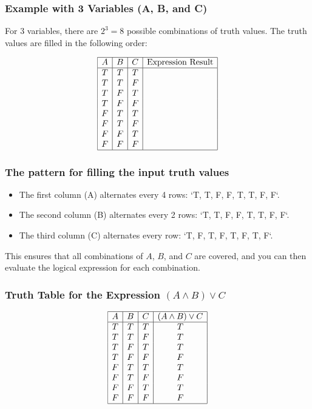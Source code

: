 \subsubsection{Example with 3 Variables (A, B, and C)}

For 3 variables, there are \(2^3 = 8\) possible combinations of truth values. The truth values are filled in the following order:

\[
\begin{array}{|c|c|c|c|}
\hline
A & B & C & \text{Expression Result} \\
\hline
T & T & T & \\
T & T & F & \\
T & F & T & \\
T & F & F & \\
F & T & T & \\
F & T & F & \\
F & F & T & \\
F & F & F & \\
\hline
\end{array}
\]

\subsubsection{The pattern for filling the input truth values}
\begin{itemize}
    \item The first column (A) alternates every 4 rows: `T, T, F, F, T, T, F, F`.
    \item The second column (B) alternates every 2 rows: `T, T, F, F, T, T, F, F`.
    \item The third column (C) alternates every row: `T, F, T, F, T, F, T, F`.
\end{itemize}

This ensures that all combinations of \(A\), \(B\), and \(C\) are covered, and you can then evaluate the logical expression for each combination.

\subsubsection{Truth Table for the Expression \( (A \land B) \lor C \)}

\[
\begin{array}{|c|c|c|c|}
\hline
A & B & C & (A \land B) \lor C \\
\hline
T & T & T & T \\
T & T & F & T \\
T & F & T & T \\
T & F & F & F \\
F & T & T & T \\
F & T & F & F \\
F & F & T & T \\
F & F & F & F \\
\hline
\end{array}
\]


